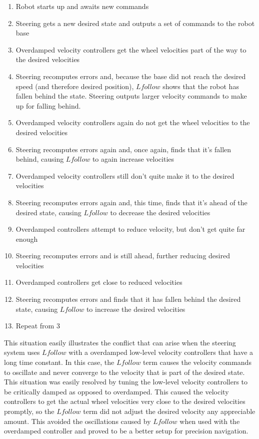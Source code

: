 \begin{enumerate}
\item Robot starts up and awaits new commands
\item Steering gets a new desired state and outputs a set of commands to the robot base
\item Overdamped velocity controllers get the wheel velocities part of the way to the desired velocities
\item Steering recomputes errors and, because the base did not reach the desired speed (and therefore desired position), $Lfollow$ shows that the robot has fallen behind the state. Steering outputs larger velocity commands to make up for falling behind.
\item Overdamped velocity controllers again do not get the wheel velocities to the desired velocities
\item Steering recomputes errors again and, once again, finds that it's fallen behind, causing $Lfollow$ to again increase velocities
\item Overdamped velocity controllers still don't quite make it to the desired velocities
\item Steering recomputes errors again and, this time, finds that it's ahead of the desired state, causing $Lfollow$ to decrease the desired velocities
\item Overdamped controllers attempt to reduce velocity, but don't get quite far enough
\item Steering recomputes errors and is still ahead, further reducing desired velocities
\item Overdamped controllers get close to reduced velocities
\item Steering recomputes errors and finds that it has fallen behind the desired state, causing $Lfollow$ to increase the desired velocities
\item Repeat from 3
\end{enumerate}

This situation easily illustrates the conflict that can arise when the steering system uses $Lfollow$ with a overdamped low-level velocity controllers that have a long time constant. In this case, the $Lfollow$ term causes the velocity commands to oscillate and never converge to the velocity that is part of the desired state. This situation was easily resolved by tuning the low-level velocity controllers to be critically damped as opposed to overdamped. This caused the velocity controllers to get the actual wheel velocities very close to the desired velocities promptly, so the $Lfollow$ term did not adjust the desired velocity any appreciable amount. This avoided the oscillations caused by $Lfollow$ when used with the overdamped controller and proved to be a better setup for precision navigation.

